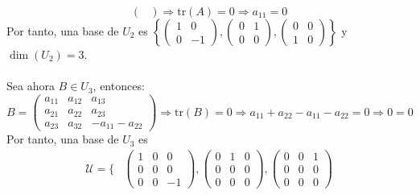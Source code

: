 \begin{ejercicio}
\begin{enumerate}
\begin{equation*}
\begin{pmatrix}
			      \end{pmatrix} \Rightarrow \text{tr}(A) = 0 \Rightarrow a_{11} = 0
		      \end{equation*}
		      Por tanto, una base de $U_2$ es $\left\{ \begin{pmatrix}
				      1 & 0  \\
				      0 & -1
			      \end{pmatrix}, \begin{pmatrix}
				      0 & 1 \\
				      0 & 0
			      \end{pmatrix}, \begin{pmatrix}
				      0 & 0 \\
				      1 & 0
			      \end{pmatrix} \right\}$ y $\dim(U_2) = 3$.
		      \\ \\
		      Sea ahora $B \in U_3$, entonces:
		      \begin{equation*}
			      B = \begin{pmatrix}
				      a_{11} & a_{12} & a_{13}           \\
				      a_{21} & a_{22} & a_{23}           \\
				      a_{23} & a_{32} & - a_{11} -a_{22}
			      \end{pmatrix} \Rightarrow \text{tr}(B) = 0 \Rightarrow a_{11} + a_{22} - a_{11} - a_{22} = 0 \Rightarrow 0 = 0
		      \end{equation*}
		      Por tanto, una base de $U_3$ es  
                \begin{align*}
                    \mathcal{U} = \{
                    &\begin{pmatrix}
				      1 & 0 & 0  \\
				      0 & 0 & 0  \\
				      0 & 0 & -1
                    \end{pmatrix}, 
                    \begin{pmatrix}
                        0 & 1 & 0 \\
                        0 & 0 & 0 \\
                        0 & 0 & 0
                    \end{pmatrix}, 
                    \begin{pmatrix}
                        0 & 0 & 1 \\
                        0 & 0 & 0 \\
                        0 & 0 & 0

\end{pmatrix}
\end{align*}
\end{enumerate}
\end{ejercicio}
